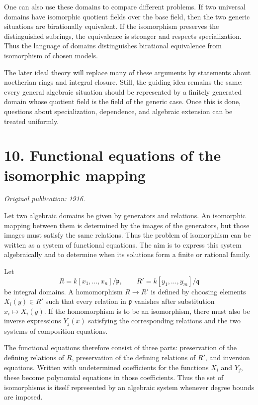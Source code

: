 \documentclass[11pt]{article}
\begin{document}
One can also use these domains to compare different problems. If two universal domains have
isomorphic quotient fields over the base field, then the two generic situations are birationally
equivalent. If the isomorphism preserves the distinguished subrings, the equivalence is stronger and
respects specialization. Thus the language of domains distinguishes birational equivalence from
isomorphism of chosen models.

The later ideal theory will replace many of these arguments by statements about noetherian rings and
integral closure. Still, the guiding idea remains the same: every general algebraic situation should
be represented by a finitely generated domain whose quotient field is the field of the generic case.
Once this is done, questions about specialization, dependence, and algebraic extension can be
treated uniformly.


\section{10. Functional equations of the isomorphic mapping}

\textit{Original publication: 1916.}

Let two algebraic domains be given by generators and relations. An isomorphic mapping between them
is determined by the images of the generators, but those images must satisfy the same relations.
Thus the problem of isomorphism can be written as a system of functional equations. The aim is to
express this system algebraically and to determine when its solutions form a finite or rational
family.


Let \[   R=k[x_1, \ldots,x_n]/\mathfrak p,   \qquad   R'=k[y_1, \ldots,y_m]/\mathfrak q \] be
integral domains. A homomorphism \(R\to R'\) is defined by choosing elements \(X_i(y)\in R'\) such
that every relation in \(\mathfrak p\) vanishes after substitution \(x_i\mapsto X_i(y)\). If the
homomorphism is to be an isomorphism, there must also be inverse expressions \(Y_j(x)\) satisfying
the corresponding relations and the two systems of composition equations.


The functional equations therefore consist of three parts: preservation of the defining relations of
\(R\), preservation of the defining relations of \(R'\), and inversion equations. Written with
undetermined coefficients for the functions \(X_i\) and \(Y_j\), these become polynomial equations
in those coefficients. Thus the set of isomorphisms is itself represented by an algebraic system
whenever degree bounds are imposed.
\end{document}
